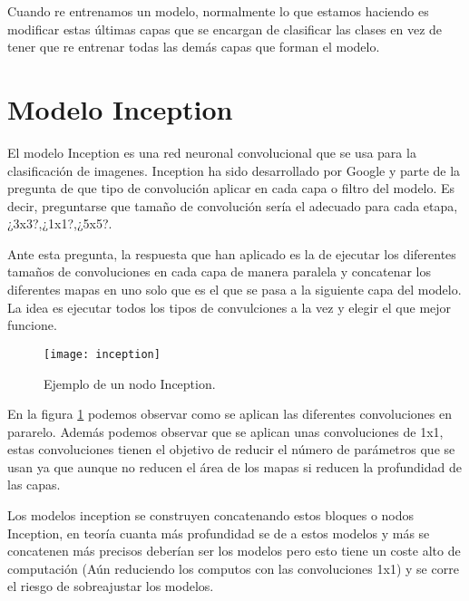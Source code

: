 Cuando re entrenamos un modelo, normalmente lo que estamos haciendo es modificar estas últimas capas que se encargan de clasificar las clases en vez de tener que re entrenar todas las demás capas que forman el modelo.

\section{Modelo Inception}

El modelo Inception es una red neuronal convolucional que se usa para la clasificación de imagenes. Inception ha sido desarrollado por Google y parte de la pregunta de que tipo de convolución aplicar en cada capa o  filtro del modelo. Es decir, preguntarse que tamaño de convolución sería el adecuado para cada etapa, ¿3x3?,¿1x1?,¿5x5?.\cite{depthwiseSeparableConvolutions}

Ante esta pregunta, la respuesta que han aplicado es la de ejecutar los diferentes tamaños de convoluciones en cada capa de manera paralela y concatenar los diferentes mapas en uno solo que es el que se pasa a la siguiente capa del modelo. La idea es ejecutar todos los tipos de convulciones a la vez y elegir el que mejor funcione.

\begin{figure}[h]
    \begin{center}%
        \begin{center}%
          \texttt{[image: inception]}%
          \caption{Ejemplo de un nodo Inception.}%
          \label{figinception}%
        \end{center}%
  	\end{center}%
\end{figure}%

En la figura \ref{figinception} podemos observar como se aplican las diferentes convoluciones en pararelo. Además podemos observar que se aplican unas convoluciones de 1x1, estas convoluciones tienen el objetivo de reducir el número de parámetros que se usan ya que aunque no reducen el área de los mapas si reducen la profundidad de las capas.\cite{inception}

Los modelos inception se construyen concatenando estos bloques o nodos Inception, en teoría cuanta más profundidad se de a estos modelos y más se concatenen más precisos deberían ser los modelos pero esto tiene un coste alto de computación (Aún reduciendo los computos con las convoluciones 1x1) y se corre el riesgo de sobreajustar los modelos.

